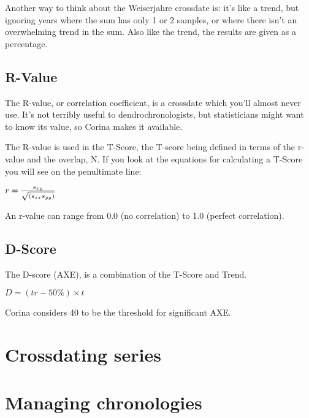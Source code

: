 Another way to think about the Weiserjahre crossdate is: it's like a trend, but ignoring years where the sum has only 1 or 2 samples, or where there isn't an overwhelming trend in the sum. Also like the trend, the results are given as a percentage.


\subsection{R-Value}
The R-value, or correlation coefficient, is a crossdate which you'll almost never use. It's not terribly useful to dendrochronologists, but statisticians might want to know its value, so Corina makes it available.

The R-value is used in the T-Score, the T-score being defined in terms of the r-value and the overlap, N. If you look at the equations for calculating a T-Score you will see on the penultimate line: 

\begin{itemize*}
 \item $r = {s_{xy} \over \sqrt{(s_{xx} s_{yy})}}$
\end{itemize*}

An r-value can range from 0.0 (no correlation) to 1.0 (perfect correlation). 
 
\subsection{D-Score}

The D-score (AXE), is a combination of the T-Score and Trend.

\begin{itemize*}
 \item $D = (tr - 50\%) \times t $
\end{itemize*}

Corina considers 40 to be the threshold for significant AXE. 

\section{Crossdating series}

\section{Managing chronologies}

